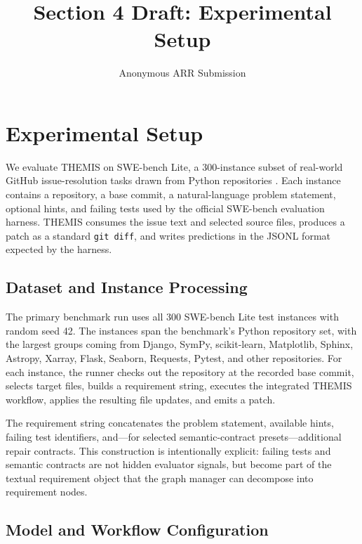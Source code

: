 \documentclass[11pt]{article}
\title{Section 4 Draft: Experimental Setup}
\author{Anonymous ARR Submission}
\begin{document}
\maketitle

\section{Experimental Setup}
\label{sec:experimental-setup}

We evaluate THEMIS on SWE-bench Lite, a 300-instance subset of real-world GitHub issue-resolution tasks drawn from Python repositories \citep{jimenez-etal-2024-swebench}.  Each instance contains a repository, a base commit, a natural-language problem statement, optional hints, and failing tests used by the official SWE-bench evaluation harness.  THEMIS consumes the issue text and selected source files, produces a patch as a standard \texttt{git diff}, and writes predictions in the JSONL format expected by the harness.

\subsection{Dataset and Instance Processing}
\label{subsec:dataset-processing}

The primary benchmark run uses all 300 SWE-bench Lite test instances with random seed 42.  The instances span the benchmark's Python repository set, with the largest groups coming from Django, SymPy, scikit-learn, Matplotlib, Sphinx, Astropy, Xarray, Flask, Seaborn, Requests, Pytest, and other repositories.  For each instance, the runner checks out the repository at the recorded base commit, selects target files, builds a requirement string, executes the integrated THEMIS workflow, applies the resulting file updates, and emits a patch.

The requirement string concatenates the problem statement, available hints, failing test identifiers, and---for selected semantic-contract presets---additional repair contracts.  This construction is intentionally explicit: failing tests and semantic contracts are not hidden evaluator signals, but become part of the textual requirement object that the graph manager can decompose into requirement nodes.

\subsection{Model and Workflow Configuration}
\label{subsec:model-workflow-config}
\end{document}
